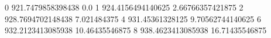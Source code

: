 0 921.7479858398438 0.0
1 924.4156494140625 2.66766357421875
2 928.7694702148438 7.021484375
4 931.45361328125 9.70562744140625
6 932.2123413085938 10.46435546875
8 938.4623413085938 16.71435546875

